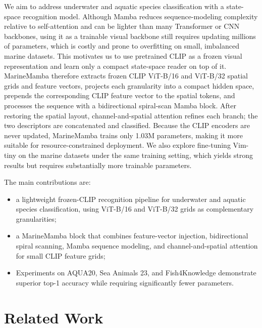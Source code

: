 \documentclass[runningheads]{llncs}
\begin{document}
We aim to address underwater and aquatic species classification with a state-space recognition model. Although Mamba reduces sequence-modeling complexity relative to self-attention and can be lighter than many Transformer or CNN backbones, using it as a trainable visual backbone still requires updating millions of parameters, which is costly and prone to overfitting on small, imbalanced marine datasets. This motivates us to use pretrained CLIP as a frozen visual representation and learn only a compact state-space reader on top of it. MarineMamba therefore extracts frozen CLIP ViT-B/16 and ViT-B/32 spatial grids and feature vectors, projects each granularity into a compact hidden space, prepends the corresponding CLIP feature vector to the spatial tokens, and processes the sequence with a bidirectional spiral-scan Mamba block. After restoring the spatial layout, channel-and-spatial attention refines each branch; the two descriptors are concatenated and classified. Because the CLIP encoders are never updated, MarineMamba trains only 1.03M parameters, making it more suitable for resource-constrained deployment. We also explore fine-tuning Vim-tiny on the marine datasets under the same training setting, which yields strong results but requires substantially more trainable parameters.

The main contributions are:
\begin{itemize}
  \item a lightweight frozen-CLIP recognition pipeline for underwater and aquatic species classification, using ViT-B/16 and ViT-B/32 grids as complementary granularities;
  \item a MarineMamba block that combines feature-vector injection, bidirectional spiral scanning, Mamba sequence modeling, and channel-and-spatial attention for small CLIP feature grids;
  \item Experiments on AQUA20, Sea Animals 23, and Fish4Knowledge demonstrate superior top-1 accuracy while requiring significantly fewer parameters.
\end{itemize}

\section{Related Work}
\label{sec:related}
\end{document}
